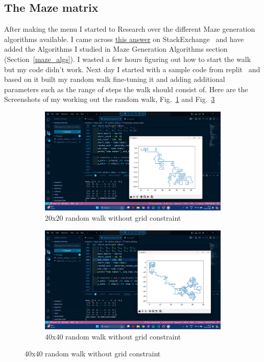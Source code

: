 \documentclass{article}
\begin{document}
\subsection{The Maze matrix}
After making the menu I started to Research over the different Maze generation algorithms available. I came across \href{https://stackoverflow.com/questions/38502/whats-a-good-algorithm-to-generate-a-maze}{this answer} on StackExchange~\cite*{stack-exchange-algorithms} and have added the Algorithms I studied in Maze Generation Algorithms section (Section~\ref{maze_algs}). I wasted a few hours figuring out how to start the walk but my code didn't work. Next day I started with a sample code from replit~\cite*{replit} and based on it built my random walk fine-tuning it and adding additional parameters such as the range of steps the walk should consist of. Here are the Screenshots of my working out the random walk, Fig.~\ref{fig:20x20random_walk} and Fig.~\ref{fig:40x40random_walk}\\

\begin{figure}[h]
    \caption[1]{}
    \begin{subfigure}[b]{0.5\textwidth}
        \centering
        \includegraphics[width=\textwidth]{screenshots/Screenshot (164).png}
        \caption[(a)]{20x20 random walk without grid constraint}
        \label{fig:20x20random_walk}
    \end{subfigure}
    \begin{subfigure}[b]{0.5\textwidth}
        \centering
        \includegraphics[width=\textwidth]{screenshots/Screenshot (166).png}
        \caption[(a)]{40x40 random walk without grid constraint}
        \label{fig:40x40random_walk}
    \end{subfigure}
\end{figure}
\end{document}
